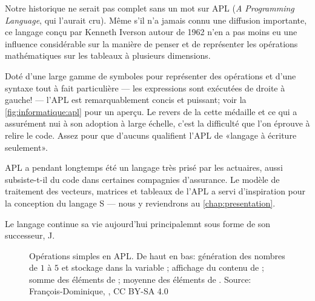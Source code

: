 Notre historique ne serait pas complet sans un mot sur APL (\emph{A
  Programming Language}, qui l'aurait cru). Même s'il n'a jamais connu
une diffusion importante, ce langage conçu par Kenneth Iverson autour
de 1962 n'en a pas moins eu une influence considérable sur la manière
de penser et de représenter les opérations mathématiques sur les
tableaux à plusieurs dimensions.

Doté d'une large gamme de symboles pour représenter des opérations et
d'une syntaxe tout à fait particulière --- les expressions sont
exécutées de droite à gauche! --- l'APL est remarquablement concis et
puissant; voir la \autoref{fig:informatique:apl} pour un aperçu. Le
revers de la cette médaille et ce qui a assurément nui à son adoption
à large échelle, c'est la difficulté que l'on éprouve à relire le
code. Assez pour que d'aucuns qualifient l'APL de «langage à écriture
seulement».

APL a pendant longtemps été un langage très prisé par les actuaires,
aussi subsiste-t-il du code dans certaines compagnies d'assurance. Le
modèle de traitement des vecteurs, matrices et tableaux de l'APL a
servi d'inspiration pour la conception du langage S --- nous y
reviendrons au \autoref{chap:presentation}.

Le langage continue sa vie aujourd'hui principalemnt sous forme de son
successeur, J.

\begin{figure}
  \centering
  \caption[Opérations simples en APL.]{Opérations simples en APL. De
    haut en bas: génération des nombres de $1$ à $5$ et stockage dans
    la variable ; affichage du contenu de ; somme des
    éléments de ; moyenne des éléments de . {\small Source:
    François-Dominique,
    , CC BY-SA 4.0}}
  \label{fig:informatique:apl}
\end{figure}

